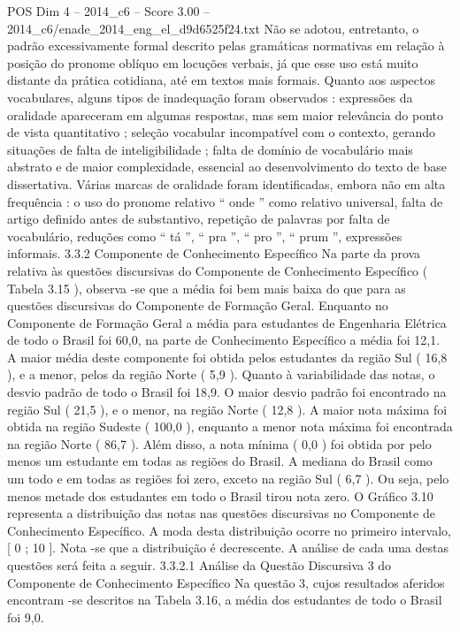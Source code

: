 \begin{textsample}{POS Dim 4 – 2014\_c6 – Score 3.00 – 2014\_c6/enade\_2014\_eng\_el\_d9d6525f24.txt}
Não se adotou, entretanto, o padrão excessivamente formal descrito pelas gramáticas normativas em relação à posição do pronome oblíquo em locuções verbais, já que esse uso está muito distante da prática cotidiana, até em textos mais formais.
Quanto aos aspectos vocabulares, alguns tipos de inadequação foram observados : expressões da oralidade apareceram em algumas respostas, mas sem maior relevância do ponto de vista quantitativo ; seleção vocabular incompatível com o contexto, gerando situações de falta de inteligibilidade ; falta de domínio de vocabulário mais abstrato e de maior complexidade, essencial ao desenvolvimento do texto de base dissertativa.
Várias marcas de oralidade foram identificadas, embora não em alta frequência : o uso do pronome relativo “ onde ” como relativo universal, falta de artigo definido antes de substantivo, repetição de palavras por falta de vocabulário, reduções como “ tá ”, “ pra ”, “ pro ”, “ prum ”, expressões informais. 3.3.2 Componente de Conhecimento Específico Na parte da prova relativa às questões discursivas do Componente de Conhecimento Específico ( Tabela 3.15 ), observa -se que a média foi bem mais baixa do que para as questões discursivas do Componente de Formação Geral.
Enquanto no Componente de Formação Geral a média para estudantes de Engenharia Elétrica de todo o Brasil foi 60,0, na parte de Conhecimento Específico a média foi 12,1.
A maior média deste componente foi obtida pelos estudantes da região Sul ( 16,8 ), e a menor, pelos da região Norte ( 5,9 ).
Quanto à variabilidade das notas, o desvio padrão de todo o Brasil foi 18,9.
O maior desvio padrão foi encontrado na região Sul ( 21,5 ), e o menor, na região Norte ( 12,8 ).
A maior nota máxima foi obtida na região Sudeste ( 100,0 ), enquanto a menor nota máxima foi encontrada na região Norte ( 86,7 ).
Além disso, a nota mínima ( 0,0 ) foi obtida por pelo menos um estudante em todas as regiões do Brasil.
A mediana do Brasil como um todo e em todas as regiões foi zero, exceto na região Sul ( 6,7 ).
Ou seja, pelo menos metade dos estudantes em todo o Brasil tirou nota zero.
O Gráfico 3.10 representa a distribuição das notas nas questões discursivas no Componente de Conhecimento Específico.
A moda desta distribuição ocorre no primeiro intervalo, [ 0 ; 10 ].
Nota -se que a distribuição é decrescente.
A análise de cada uma destas questões será feita a seguir. 3.3.2.1 Análise da Questão Discursiva 3 do Componente de Conhecimento Específico Na questão 3, cujos resultados aferidos encontram -se descritos na Tabela 3.16, a média dos estudantes de todo o Brasil foi 9,0.

\end{textsample}
